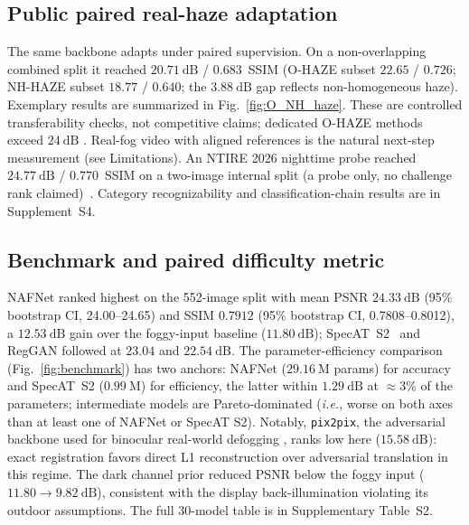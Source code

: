 \documentclass{optica-article}
\begin{document}
\subsection{Public paired real-haze adaptation}
\label{subsec:realhaze_results}
 
The same backbone adapts under paired supervision. On a
non-overlapping combined split it reached $20.71~\mathrm{dB}$ /
$0.683$~SSIM (O-HAZE subset $22.65$ / $0.726$; NH-HAZE subset
$18.77$ / $0.640$; the $3.88~\mathrm{dB}$ gap reflects
non-homogeneous haze). Exemplary results are summarized in
Fig.~\ref{fig:O_NH_haze}. These are controlled transferability checks,
not competitive claims; dedicated O-HAZE methods exceed
$24~\mathrm{dB}$ \cite{chen2024pttd,chen2025dehazexl}.
Real-fog video with aligned references is the natural next-step
measurement (see Limitations).
An NTIRE 2026 nighttime probe reached $24.77~\mathrm{dB}$ /
$0.770$~SSIM on a two-image internal split (a probe only, no
challenge rank claimed)~\cite{ancuti2026ntire,ancuti2026nt}. Category recognizability and
classification-chain results are in Supplement~S4.

\subsection{Benchmark and paired difficulty metric}
\label{subsec:benchmark_results}
 
NAFNet ranked highest on the 552-image split with mean PSNR
$24.33~\mathrm{dB}$ (95\% bootstrap CI, 24.00--24.65) and SSIM $0.7912$ (95\% bootstrap CI, 0.7808--0.8012), a $12.53~\mathrm{dB}$ gain
over the foggy-input baseline ($11.80~\mathrm{dB}$); SpecAT~S2~\cite{yao2024specat} and
RegGAN followed at $23.04$ and $22.54~\mathrm{dB}$. The parameter-efficiency comparison
(Fig.~\ref{fig:benchmark}) has two anchors: NAFNet
($29.16~\mathrm{M}$ params) for accuracy and SpecAT~S2
($0.99~\mathrm{M}$) for efficiency, the latter within
$1.29~\mathrm{dB}$ at $\approx 3\%$ of the parameters; intermediate models are Pareto-dominated (\emph{i.e.}, worse on both axes than at least one of NAFNet or SpecAT S2). Notably, \texttt{pix2pix}, the adversarial
backbone used for binocular real-world defogging
\cite{isola2017pix2pix, pollak2024stereofog}, ranks low here ($15.58~\mathrm{dB}$):
exact registration favors direct L1 reconstruction over adversarial
translation in this regime. The dark channel prior
\cite{he2010single} reduced PSNR below the foggy input ($11.80
\rightarrow 9.82~\mathrm{dB}$), consistent with the display
back-illumination violating its outdoor assumptions. The full 30-model
table is in Supplementary Table~S2.
 
\end{document}
